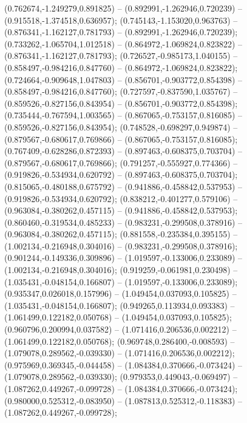  (0.762674,-1.249279,0.891825) -- (0.892991,-1.262946,0.720239) -- (0.915518,-1.374518,0.636957);
 (0.745143,-1.153020,0.963763) -- (0.876341,-1.162127,0.781793) -- (0.892991,-1.262946,0.720239);
 (0.733262,-1.065704,1.012518) -- (0.864972,-1.069824,0.823822) -- (0.876341,-1.162127,0.781793);
 (0.726527,-0.985173,1.040155) -- (0.858497,-0.984216,0.847760) -- (0.864972,-1.069824,0.823822);
 (0.724664,-0.909648,1.047803) -- (0.856701,-0.903772,0.854398) -- (0.858497,-0.984216,0.847760);
 (0.727597,-0.837590,1.035767) -- (0.859526,-0.827156,0.843954) -- (0.856701,-0.903772,0.854398);
 (0.735444,-0.767594,1.003565) -- (0.867065,-0.753157,0.816085) -- (0.859526,-0.827156,0.843954);
 (0.748528,-0.698297,0.949874) -- (0.879567,-0.680617,0.769866) -- (0.867065,-0.753157,0.816085);
 (0.767409,-0.628286,0.872393) -- (0.897463,-0.608375,0.703704) -- (0.879567,-0.680617,0.769866);
 (0.791257,-0.555927,0.774366) -- (0.919826,-0.534934,0.620792) -- (0.897463,-0.608375,0.703704);
 (0.815065,-0.480188,0.675792) -- (0.941886,-0.458842,0.537953) -- (0.919826,-0.534934,0.620792);
 (0.838212,-0.401277,0.579106) -- (0.963084,-0.380262,0.457115) -- (0.941886,-0.458842,0.537953);
 (0.860460,-0.319534,0.485233) -- (0.983231,-0.299508,0.378916) -- (0.963084,-0.380262,0.457115);
 (0.881558,-0.235384,0.395155) -- (1.002134,-0.216948,0.304016) -- (0.983231,-0.299508,0.378916);
 (0.901244,-0.149336,0.309896) -- (1.019597,-0.133006,0.233089) -- (1.002134,-0.216948,0.304016);
 (0.919259,-0.061981,0.230498) -- (1.035431,-0.048154,0.166807) -- (1.019597,-0.133006,0.233089);
 (0.935347,0.026018,0.157996) -- (1.049454,0.037093,0.105825) -- (1.035431,-0.048154,0.166807);
 (0.949265,0.113934,0.093383) -- (1.061499,0.122182,0.050768) -- (1.049454,0.037093,0.105825);
 (0.960796,0.200994,0.037582) -- (1.071416,0.206536,0.002212) -- (1.061499,0.122182,0.050768);
 (0.969748,0.286400,-0.008593) -- (1.079078,0.289562,-0.039330) -- (1.071416,0.206536,0.002212);
 (0.975969,0.369345,-0.044458) -- (1.084384,0.370666,-0.073424) -- (1.079078,0.289562,-0.039330);
 (0.979353,0.449043,-0.069497) -- (1.087262,0.449267,-0.099728) -- (1.084384,0.370666,-0.073424);
 (0.980000,0.525312,-0.083950) -- (1.087813,0.525312,-0.118383) -- (1.087262,0.449267,-0.099728);
